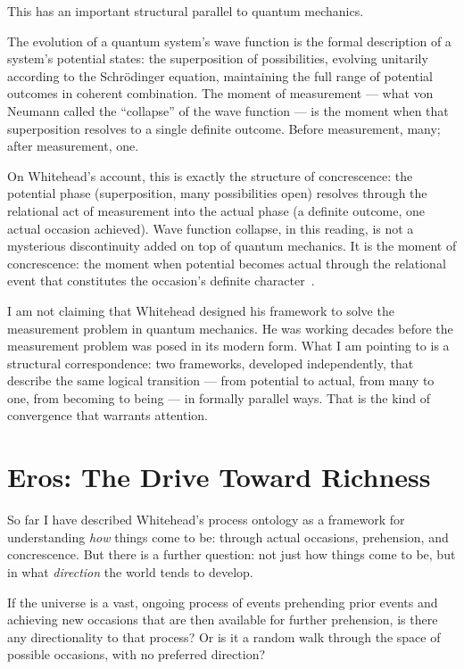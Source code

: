 This has an important structural parallel to quantum mechanics.

The evolution of a quantum system's wave function is the formal description
of a system's potential states: the superposition of possibilities, evolving
unitarily according to the Schrödinger equation, maintaining the full range
of potential outcomes in coherent combination.
The moment of measurement --- what von Neumann called the ``collapse'' of
the wave function --- is the moment when that superposition resolves to a
single definite outcome.
Before measurement, many; after measurement, one.

On Whitehead's account, this is exactly the structure of concrescence:
the potential phase (superposition, many possibilities open) resolves
through the relational act of measurement into the actual phase
(a definite outcome, one actual occasion achieved).
Wave function collapse, in this reading, is not a mysterious discontinuity
added on top of quantum mechanics.
It is the moment of concrescence: the moment when potential becomes actual
through the relational event that constitutes the occasion's definite
character~\citeyearpar{Epperson2004}.

I am not claiming that Whitehead designed his framework to solve the
measurement problem in quantum mechanics.
He was working decades before the measurement problem was posed in its
modern form.
What I am pointing to is a structural correspondence: two frameworks,
developed independently, that describe the same logical transition ---
from potential to actual, from many to one, from becoming to being ---
in formally parallel ways.
That is the kind of convergence that warrants attention.

\section{Eros: The Drive Toward Richness}
\label{sec:ch4-eros}

So far I have described Whitehead's process ontology as a framework for
understanding \emph{how} things come to be: through actual occasions, prehension,
and concrescence.
But there is a further question: not just how things come to be, but in
what \emph{direction} the world tends to develop.

If the universe is a vast, ongoing process of events prehending prior events
and achieving new occasions that are then available for further prehension,
is there any directionality to that process?
Or is it a random walk through the space of possible occasions, with no
preferred direction?

